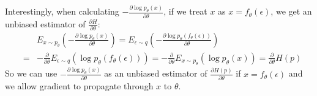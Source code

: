 \documentclass{article}
\newcommand{\pian}[2]{\frac{\partial #1}{\partial #2}}
\begin{document}
Interestingly, when calculating $-\pian{\log p_\theta(x)}{\theta}$, if we treat $x$ as $x=f_\theta(\epsilon)$, we get an unbiased estimator of $\pian{H}{\theta}$:
\begin{eqnarray*}
&& E_{x\sim p_\theta}\left(-\pian{\log p_\theta(x)}{\theta}\right) = E_{\epsilon \sim q}\left(-\pian{\log p_\theta(f_\theta(\epsilon))}{\theta}\right) \\
&=& -\pian{}{\theta}E_{\epsilon \sim q}\left(\log p_\theta(f_\theta(\epsilon))\right) = -\pian{}{\theta}E_{x \sim p_\theta}\left(\log p_\theta(x)\right) = \pian{}{\theta}H(p)
\end{eqnarray*}
So we can use $-\pian{\log p_\theta(x)}{\theta}$ as an unbiased estimator of $\pian{H(p)}{\theta}$ if $x=f_\theta(\epsilon)$ and we allow gradient to propagate through $x$ to $\theta$.
\end{document}

